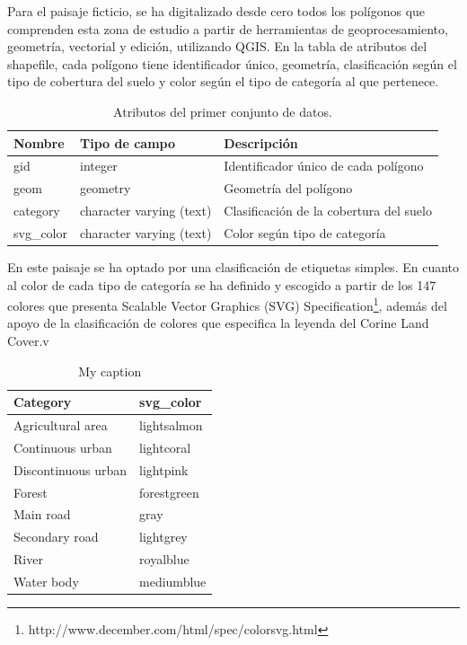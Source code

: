 Para el paisaje ficticio, se ha digitalizado desde cero todos los polígonos que comprenden esta zona de estudio a partir de herramientas de geoprocesamiento, geometría, vectorial y edición, utilizando QGIS. En la tabla de atributos del shapefile, cada polígono tiene identificador único, geometría, clasificación según el tipo de cobertura del suelo y color según el tipo de categoría al que pertenece.

\begin{table}[]
\centering
\caption{Atributos del primer conjunto de datos.}
\label{my-label}
\begin{tabular}{@{}lll@{}}
\toprule
\textbf{Nombre} & \textbf{Tipo de campo}   & \textbf{Descripción}                    \\ \midrule
gid             & integer                  & Identificador único de cada polígono    \\
geom            & geometry                 & Geometría del polígono                  \\
category        & character varying (text) & Clasificación de la cobertura del suelo \\
svg\_color      & character varying (text) & Color según tipo de categoría           \\ \bottomrule
\end{tabular}
\end{table}

En este paisaje se ha optado por una clasificación de etiquetas simples. En cuanto al color de cada tipo de categoría se ha definido y escogido a partir de los 147 colores que presenta Scalable Vector Graphics (SVG) Specification\footnote{http://www.december.com/html/spec/colorsvg.html}, además del apoyo de la clasificación de colores que especifica la leyenda del Corine Land Cover.v

\begin{table}[]
\centering
\caption{My caption}
\label{my-label}
\begin{tabular}{@{}ll@{}}
\toprule
\textbf{Category}   & \textbf{svg\_color} \\ \midrule
Agricultural area   & lightsalmon            \\
Continuous urban    & lightcoral             \\
Discontinuous urban & lightpink              \\
Forest              & forestgreen            \\
Main road           & gray                   \\
Secondary road      & lightgrey              \\
River               & royalblue              \\
Water body          & mediumblue             \\ \bottomrule
\end{tabular}
\end{table}

